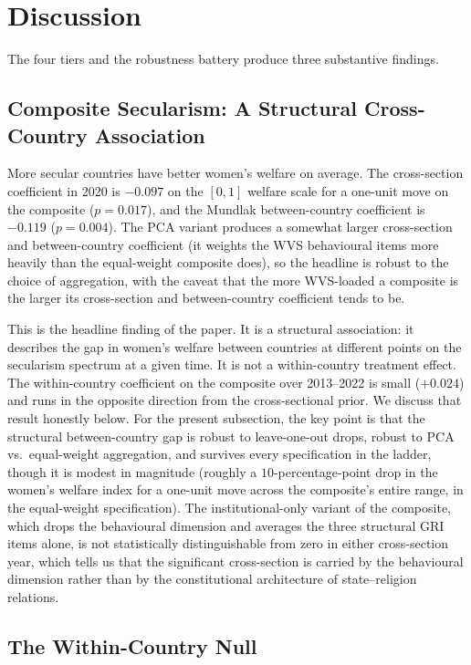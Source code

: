 \documentclass[12pt,a4paper]{article}
\begin{document}
\section{Discussion}

The four tiers and the robustness battery produce three substantive findings.

\subsection{Composite Secularism: A Structural Cross-Country Association}

More secular countries have better women's welfare on average. The cross-section coefficient in 2020 is $-0.097$ on the $[0, 1]$ welfare scale for a one-unit move on the composite ($p = 0.017$), and the Mundlak between-country coefficient is $-0.119$ ($p = 0.004$). The PCA variant produces a somewhat larger cross-section and between-country coefficient (it weights the WVS behavioural items more heavily than the equal-weight composite does), so the headline is robust to the choice of aggregation, with the caveat that the more WVS-loaded a composite is the larger its cross-section and between-country coefficient tends to be.

This is the headline finding of the paper. It is a structural association: it describes the gap in women's welfare between countries at different points on the secularism spectrum at a given time. It is not a within-country treatment effect. The within-country coefficient on the composite over 2013--2022 is small ($+0.024$) and runs in the opposite direction from the cross-sectional prior. We discuss that result honestly below. For the present subsection, the key point is that the structural between-country gap is robust to leave-one-out drops, robust to PCA vs.\ equal-weight aggregation, and survives every specification in the ladder, though it is modest in magnitude (roughly a $10$-percentage-point drop in the women's welfare index for a one-unit move across the composite's entire range, in the equal-weight specification). The institutional-only variant of the composite, which drops the behavioural dimension and averages the three structural GRI items alone, is not statistically distinguishable from zero in either cross-section year, which tells us that the significant cross-section is carried by the behavioural dimension rather than by the constitutional architecture of state--religion relations.

\subsection{The Within-Country Null}
\label{sec:within-null}
\end{document}

